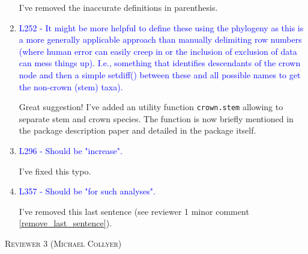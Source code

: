 \documentclass[12pt,letterpaper]{article}
\renewcommand{\section}[1]{%
\bigskip
\begin{center}
\begin{Large}
\normalfont\scshape #1
\medskip
\end{Large}
\end{center}}
\begin{document}
\begin{enumerate}
I've removed the inaccurate definitions in parenthesis.

\item{\textcolor{blue}{L252 - It might be more helpful to define these using the phylogeny as this is a more generally applicable approach than manually delimiting row numbers (where human error can easily creep in or the inclusion of exclusion of data can mess things up). I.e., something that identifies descendants of the crown node and then a simple setdiff() between these and all possible names to get the non-crown (stem) taxa).}}

Great suggestion! I've added an utility function \texttt{crown.stem} allowing to separate stem and crown species.
The function is now briefly mentioned in the package description paper and detailed in the package itself.

\item{\textcolor{blue}{L296 - Should be "increase".}}

I've fixed this typo.

\item{\textcolor{blue}{L357 - Should be "for such analyses".}}

I've removed this last sentence (see reviewer 1 minor comment \ref{remove_last_sentence}).

\end{enumerate}






%
%






\section{Reviewer 3 (Michael Collyer)}
\end{document}
